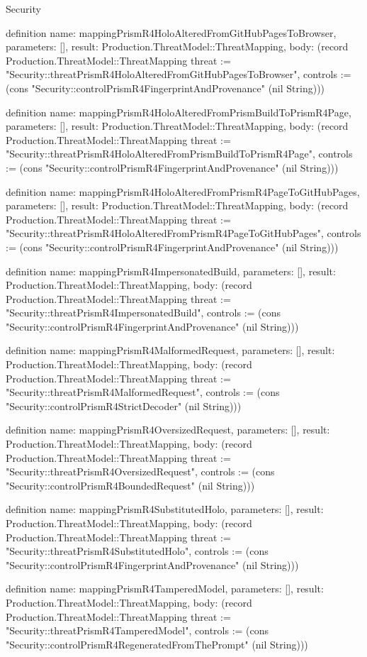 \begin{lexlean}{Security}
\begin{semanticmodule}
definition{
  name: mappingPrismR4HoloAlteredFromGitHubPagesToBrowser,
  parameters: [],
  result: Production.ThreatModel::ThreatMapping,
  body: (record Production.ThreatModel::ThreatMapping {threat := "Security::threatPrismR4HoloAlteredFromGitHubPagesToBrowser", controls := (cons "Security::controlPrismR4FingerprintAndProvenance" (nil String))})
}

definition{
  name: mappingPrismR4HoloAlteredFromPrismBuildToPrismR4Page,
  parameters: [],
  result: Production.ThreatModel::ThreatMapping,
  body: (record Production.ThreatModel::ThreatMapping {threat := "Security::threatPrismR4HoloAlteredFromPrismBuildToPrismR4Page", controls := (cons "Security::controlPrismR4FingerprintAndProvenance" (nil String))})
}

definition{
  name: mappingPrismR4HoloAlteredFromPrismR4PageToGitHubPages,
  parameters: [],
  result: Production.ThreatModel::ThreatMapping,
  body: (record Production.ThreatModel::ThreatMapping {threat := "Security::threatPrismR4HoloAlteredFromPrismR4PageToGitHubPages", controls := (cons "Security::controlPrismR4FingerprintAndProvenance" (nil String))})
}

definition{
  name: mappingPrismR4ImpersonatedBuild,
  parameters: [],
  result: Production.ThreatModel::ThreatMapping,
  body: (record Production.ThreatModel::ThreatMapping {threat := "Security::threatPrismR4ImpersonatedBuild", controls := (cons "Security::controlPrismR4FingerprintAndProvenance" (nil String))})
}

definition{
  name: mappingPrismR4MalformedRequest,
  parameters: [],
  result: Production.ThreatModel::ThreatMapping,
  body: (record Production.ThreatModel::ThreatMapping {threat := "Security::threatPrismR4MalformedRequest", controls := (cons "Security::controlPrismR4StrictDecoder" (nil String))})
}

definition{
  name: mappingPrismR4OversizedRequest,
  parameters: [],
  result: Production.ThreatModel::ThreatMapping,
  body: (record Production.ThreatModel::ThreatMapping {threat := "Security::threatPrismR4OversizedRequest", controls := (cons "Security::controlPrismR4BoundedRequest" (nil String))})
}

definition{
  name: mappingPrismR4SubstitutedHolo,
  parameters: [],
  result: Production.ThreatModel::ThreatMapping,
  body: (record Production.ThreatModel::ThreatMapping {threat := "Security::threatPrismR4SubstitutedHolo", controls := (cons "Security::controlPrismR4FingerprintAndProvenance" (nil String))})
}

definition{
  name: mappingPrismR4TamperedModel,
  parameters: [],
  result: Production.ThreatModel::ThreatMapping,
  body: (record Production.ThreatModel::ThreatMapping {threat := "Security::threatPrismR4TamperedModel", controls := (cons "Security::controlPrismR4RegeneratedFromThePrompt" (nil String))})
}


\end{semanticmodule}
\end{lexlean}
